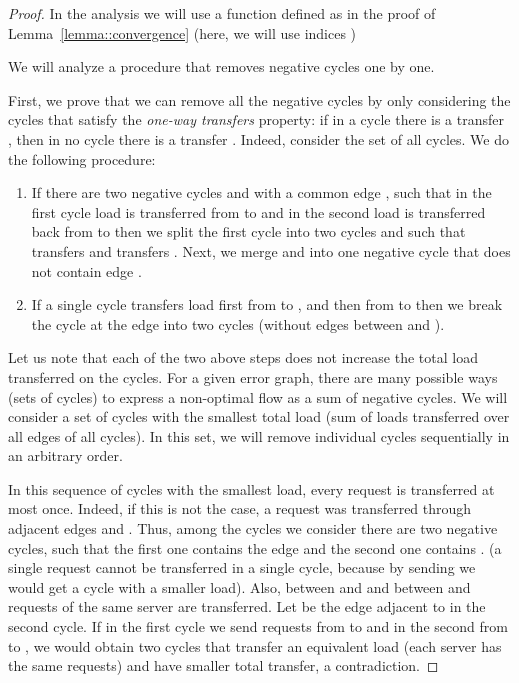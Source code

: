 \documentclass[11pt]{article}
\begin{document}
\begin{proof}
In the analysis we will use a function  defined as  in the proof of Lemma~\ref{lemma::convergence} (here, we will use indices ) 


We will analyze a procedure that removes negative cycles one by one. 

First, we prove that we can remove all the negative cycles by only considering the cycles that satisfy the \emph{one-way transfers} property: if in a cycle there is a transfer , then in no cycle there is a transfer .
Indeed, consider the set of all cycles. We do the following procedure:
\begin{enumerate}
\item If there are two negative cycles  and  with a common edge , such that in the first cycle load  is transferred from  to  and in the second load  is
transferred back from  to  
then we split the first cycle  into two cycles  and  such that  transfers  and  transfers . Next, we merge  and  into one negative cycle that does not contain edge . 
\item If a single cycle transfers load first from  to , and then from  to  then we break the cycle at the edge  into two cycles (without edges between  and ).  \label{enum:cycle-break2}
\end{enumerate}
Let us note that each of the two above steps does not increase the total load transferred on the cycles.
For a given error graph, there are many possible ways (sets of cycles) to express a non-optimal flow as a sum of negative cycles. We will consider a set of cycles with the smallest total load (sum of loads transferred over all edges of all cycles).
In this set, we will remove individual cycles sequentially in an arbitrary order.

In this sequence of cycles with the smallest load, every request is transferred at most once.
Indeed, if this is not the case, a request was transferred through adjacent edges  and . Thus, among the cycles we consider there are two negative cycles, such that the first one contains the edge  and the second one contains . 
(a single request cannot be transferred  in a single cycle, because by sending  we would get a cycle with a smaller load).
Also, between  and  and between  and  requests of the same server  are transferred. Let  be the edge adjacent to  in the second cycle.
If in the first cycle we send requests from  to  and in the second from  to , we would obtain two cycles that transfer an equivalent load (each server has the same requests) and have
smaller total transfer, a contradiction.





\end{proof}
\end{document}
